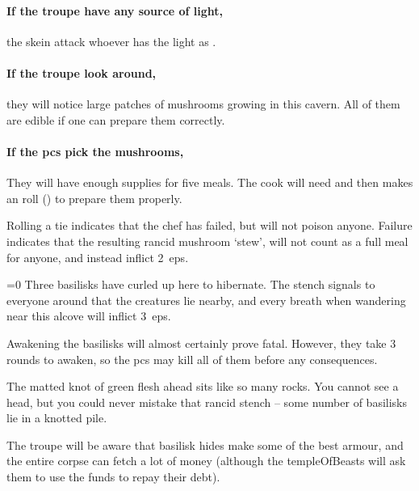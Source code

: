 \begin{multicols}{2}
\paragraph{If the troupe have any source of light,}
the skein attack whoever has the light as .

\skeinSwarm

\paragraph{If the troupe look around,}
they will notice large patches of mushrooms growing in this cavern.
All of them are edible if one can prepare them correctly.

\paragraph{If the \glspl{pc} pick the mushrooms,}
They will have enough supplies for five meals.
The cook will need  and then makes an  roll (\tn[10]) to prepare them properly.

Rolling a tie indicates that the chef has failed, but will not poison anyone.
Failure indicates that the resulting rancid mushroom `stew', will not count as a full meal for anyone, and instead inflict 2~\glspl{ep}.


\playCommentaryRestII

\metroMapDistances[b]


\ifnum\value{temperature}=0
  Three \glspl{basilisk} have curled up here to hibernate.
  The stench signals to everyone around that the creatures lie nearby, and every breath when wandering near this alcove will inflict 3~\glspl{ep}.

  Awakening the \glspl{basilisk} will almost certainly prove fatal.
  However, they take 3 rounds to awaken, so the \glspl{pc} may kill all of them before any consequences.

  \begin{boxtext}
    The matted knot of green flesh ahead sits like so many rocks.
    You cannot see a head, but you could never mistake that rancid stench -- some number of \glspl{basilisk} lie in a knotted pile.
  \end{boxtext}

  The troupe will be aware that \gls{basilisk} hides make some of the best armour, and the entire corpse can fetch a lot of money (although the \gls{templeOfBeasts} will ask them to use the funds to repay their debt).


\end{multicols}
